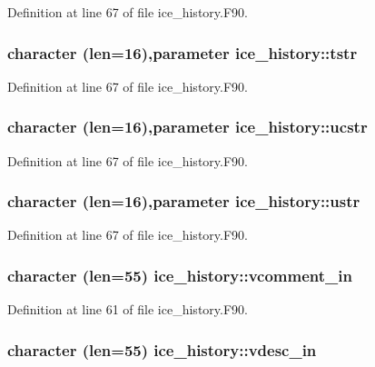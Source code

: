 Definition at line 67 of file ice\_\-history.F90.\hypertarget{namespaceice__history_ab16190577859fe12663ca28b0690e5ec}{
\subsubsection[{tstr}]{\setlength{\rightskip}{0pt plus 5cm}character (len=16),parameter {\bf ice\_\-history::tstr}}}
\label{namespaceice__history_ab16190577859fe12663ca28b0690e5ec}


Definition at line 67 of file ice\_\-history.F90.\hypertarget{namespaceice__history_a6d6a4603e818d63fe00df57441c0a5fb}{
\subsubsection[{ucstr}]{\setlength{\rightskip}{0pt plus 5cm}character (len=16),parameter {\bf ice\_\-history::ucstr}}}
\label{namespaceice__history_a6d6a4603e818d63fe00df57441c0a5fb}


Definition at line 67 of file ice\_\-history.F90.\hypertarget{namespaceice__history_a2b8d89b4e6bf73f99efde8b74906cef9}{
\subsubsection[{ustr}]{\setlength{\rightskip}{0pt plus 5cm}character (len=16),parameter {\bf ice\_\-history::ustr}}}
\label{namespaceice__history_a2b8d89b4e6bf73f99efde8b74906cef9}


Definition at line 67 of file ice\_\-history.F90.\hypertarget{namespaceice__history_ab6f7ee9f2623bb2e08b57018462544df}{
\subsubsection[{vcomment\_\-in}]{\setlength{\rightskip}{0pt plus 5cm}character (len=55) {\bf ice\_\-history::vcomment\_\-in}}}
\label{namespaceice__history_ab6f7ee9f2623bb2e08b57018462544df}


Definition at line 61 of file ice\_\-history.F90.\hypertarget{namespaceice__history_a000ee3af05f02fbff13085400a751e53}{
\subsubsection[{vdesc\_\-in}]{\setlength{\rightskip}{0pt plus 5cm}character (len=55) {\bf ice\_\-history::vdesc\_\-in}}}
\label{namespaceice__history_a000ee3af05f02fbff13085400a751e53}


